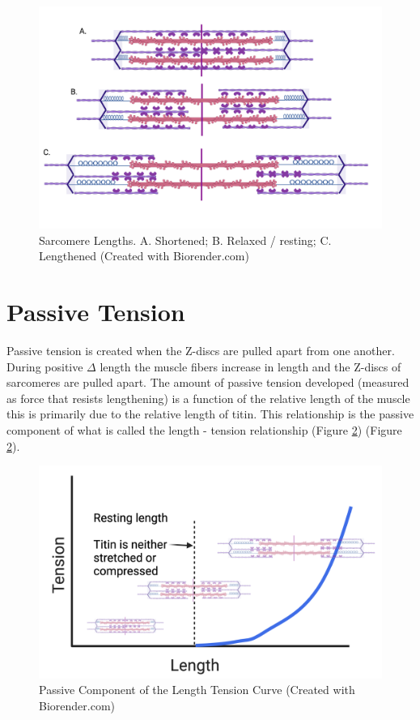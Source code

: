 \begin{figure}[!ht]
    \centering
    \includegraphics[width=1\linewidth]{./figure/Sarcomere_Lengths.png}
    \caption{Sarcomere Lengths. A. Shortened; B. Relaxed / resting; C. Lengthened \footnotesize{(Created with Biorender.com)}}
    \label{fig:Sarcomere_Lengths}
\end{figure}

\section{Passive Tension}
Passive tension is created when the Z-discs are pulled apart from one another. During positive $\Delta$ length the muscle fibers increase in length and the Z-discs of sarcomeres are pulled apart. The amount of passive tension developed (measured as force that resists lengthening) is a function of the relative length of the muscle this is primarily due to the relative length of titin. This relationship is the passive component of what is called the length - tension relationship (Figure \ref{fig:passive_lt}) (Figure \ref{fig:passive_lt}).

\begin{figure}[!ht]
    \centering
    \includegraphics[width=1\linewidth]{./figure/passive_lt.png}
    \caption{Passive Component of the Length Tension Curve \footnotesize{(Created with Biorender.com)}}
    \label{fig:passive_lt}
\end{figure}

